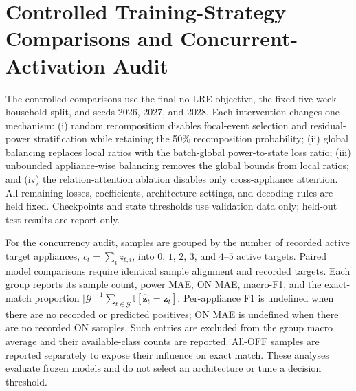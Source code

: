 \documentclass[conference]{IEEEtran}
\begin{document}
\section{Controlled Training-Strategy Comparisons and Concurrent-Activation Audit}
\label{sec:reviewer-controls}

The controlled comparisons use the final no-LRE objective, the fixed five-week household split, and seeds 2026, 2027, and 2028. Each intervention changes one mechanism: (i) random recomposition disables focal-event selection and residual-power stratification while retaining the 50\% recomposition probability; (ii) global balancing replaces local ratios with the batch-global power-to-state loss ratio; (iii) unbounded appliance-wise balancing removes the global bounds from local ratios; and (iv) the relation-attention ablation disables only cross-appliance attention. All remaining losses, coefficients, architecture settings, and decoding rules are held fixed. Checkpoints and state thresholds use validation data only; held-out test results are report-only.

For the concurrency audit, samples are grouped by the number of recorded active target appliances, $c_t=\sum_i z_{t,i}$, into $0$, $1$, $2$, $3$, and $4$--$5$ active targets. Paired model comparisons require identical sample alignment and recorded targets. Each group reports its sample count, power MAE, ON MAE, macro-F1, and the exact-match proportion $|\mathcal{G}|^{-1}\sum_{t\in\mathcal{G}}\mathbb{I}[\hat{\mathbf z}_t=\mathbf z_t]$. Per-appliance F1 is undefined when there are no recorded or predicted positives; ON MAE is undefined when there are no recorded ON samples. Such entries are excluded from the group macro average and their available-class counts are reported. All-OFF samples are reported separately to expose their influence on exact match. These analyses evaluate frozen models and do not select an architecture or tune a decision threshold.
\end{document}
